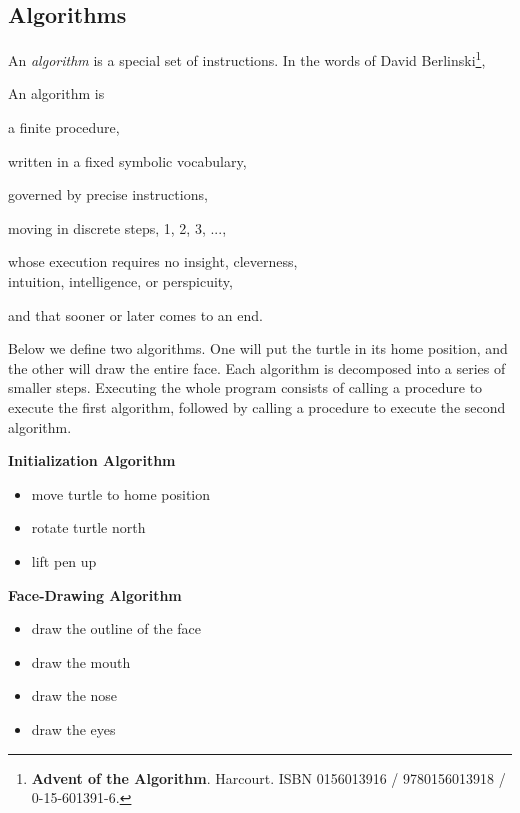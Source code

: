 \documentclass[pdftex,12pt]{artikel3}
\begin{document}

\subsection{Algorithms}

An \emph{algorithm} is a special set of instructions.
In the words of David Berlinski\footnote{{\bf Advent of the Algorithm}.
Harcourt. ISBN 0156013916 / 9780156013918 / 0-15-601391-6.},
\begin{center}
\begin{tt}
An algorithm is

a finite procedure,

written in a fixed symbolic vocabulary,

governed by precise instructions,

moving in discrete steps, 1, 2, 3, ...,

whose execution requires no insight, cleverness, \\

intuition, intelligence, or perspicuity,

and that sooner or later comes to an end.
\end{tt}
\end{center}

Below we define two algorithms.
One will put the turtle in its home position, 
and the other will draw the entire face.
Each algorithm is decomposed into a series of smaller steps.
Executing the whole program consists of calling a procedure to
execute the first algorithm, followed by calling a procedure to
execute the second algorithm. 

{\bf Initialization Algorithm}
\begin{itemize}
\item 
move turtle to home position
\item
rotate turtle north
\item
lift pen up
\end{itemize}

{\bf Face-Drawing Algorithm}
\begin{itemize}
\item
draw the outline of the face
\item
draw the mouth
\item
draw the nose
\item 
draw the eyes
\end{itemize}
\end{document}
